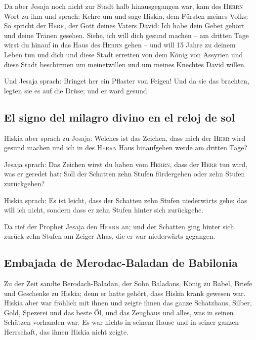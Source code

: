  Da aber Jesaja noch nicht zur Stadt halb hinausgegangen
war, kam des \textsc{Herrn} Wort zu ihm und sprach:  Kehre
um und sage Hiskia, dem Fürsten meines Volks: So spricht der
\textsc{Herr}, der Gott deines Vaters David: Ich habe dein Gebet gehört
und deine Tränen gesehen. Siehe, ich will dich gesund machen -- am
dritten Tage wirst du hinauf in das Haus des \textsc{Herrn} gehen --
 und will 15 Jahre zu deinem Leben tun und dich und diese
Stadt erretten von dem König von Assyrien und diese Stadt beschirmen um
meinetwillen und um meines Knechtes David willen.

 Und Jesaja sprach: Bringet her ein Pflaster von Feigen!
Und da sie das brachten, legten sie es auf die Drüse; und er ward
gesund.

\hypertarget{el-signo-del-milagro-divino-en-el-reloj-de-sol}{%
\subsection{El signo del milagro divino en el reloj de
sol}\label{el-signo-del-milagro-divino-en-el-reloj-de-sol}}

 Hiskia aber sprach zu Jesaja: Welches ist das Zeichen,
dass mich der \textsc{Herr} wird gesund machen und ich in des
\textsc{Herrn} Haus hinaufgehen werde am dritten Tage?

 Jesaja sprach: Das Zeichen wirst du haben vom
\textsc{Herrn}, dass der \textsc{Herr} tun wird, was er geredet hat:
Soll der Schatten zehn Stufen fürdergehen oder zehn Stufen zurückgehen?

 Hiskia sprach: Es ist leicht, dass der Schatten zehn
Stufen niederwärts gehe; das will ich nicht, sondern dass er zehn Stufen
hinter sich zurückgehe.

 Da rief der Prophet Jesaja den \textsc{Herrn} an; und
der Schatten ging hinter sich zurück zehn Stufen am Zeiger Ahas, die er
war niederwärts gegangen.

\hypertarget{embajada-de-merodac-baladan-de-babilonia}{%
\subsection{Embajada de Merodac-Baladan de
Babilonia}\label{embajada-de-merodac-baladan-de-babilonia}}

 Zu der Zeit sandte Berodach-Baladan, der Sohn Baladans,
König zu Babel, Briefe und Geschenke zu Hiskia; denn er hatte gehört,
dass Hiskia krank gewesen war.  Hiskia aber war fröhlich
mit ihnen und zeigte ihnen das ganze Schatzhaus, Silber, Gold, Spezerei
und das beste Öl, und das Zeughaus und alles, was in seinen Schätzen
vorhanden war. Es war nichts in seinem Hause und in seiner ganzen
Herrschaft, das ihnen Hiskia nicht zeigte.

